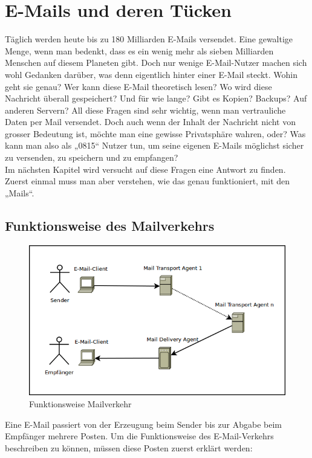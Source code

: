 \section{E-Mails und deren Tücken}
Täglich werden heute bis zu 180 Milliarden E-Mails versendet. Eine gewaltige Menge, wenn man bedenkt, dass es ein wenig mehr als sieben Milliarden Menschen auf diesem Planeten gibt.
Doch nur wenige E-Mail-Nutzer machen sich wohl Gedanken darüber, was denn eigentlich hinter einer E-Mail steckt. Wohin geht sie genau? Wer kann diese E-Mail theoretisch lesen? Wo wird diese Nachricht überall gespeichert? Und für wie lange? Gibt es Kopien? Backups? Auf anderen Servern?
All diese Fragen sind sehr wichtig, wenn man vertrauliche Daten per Mail versendet. Doch auch wenn der Inhalt der Nachricht nicht von grosser Bedeutung ist, möchte man eine gewisse Privatsphäre wahren, oder?
Was kann man also als „0815“ Nutzer tun, um seine eigenen E-Mails möglichst sicher zu versenden, zu speichern und zu empfangen?
\\
Im nächsten Kapitel wird versucht auf diese Fragen eine Antwort zu finden. Zuerst einmal muss man aber verstehen, wie das genau funktioniert, mit den „Mails“.

\subsection{Funktionsweise des Mailverkehrs}

\begin{figure}[H]
\centering
\noindent\includegraphics[scale=0.6]{images/email_function}
\caption{Funktionsweise Mailverkehr}
\end{figure}

Eine E-Mail passiert von der Erzeugung beim Sender bis zur Abgabe beim Empfänger mehrere Posten. Um die Funktionsweise des E-Mail-Verkehrs beschreiben zu können, müssen diese Posten zuerst erklärt werden:

